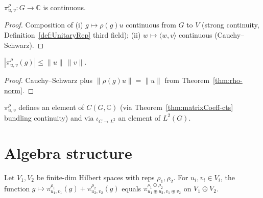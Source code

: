 \begin{theorem}
  \label{thm:matrixCoeff-cts}
  \leanok
  $\pi_{u,v}^\rho : G \to \mathbb C$ is continuous.
\end{theorem}

\begin{proof}
  Composition of (i) $g \mapsto \rho(g) u$ continuous from $G$ to $V$
  (strong continuity, Definition~\ref{def:UnitaryRep} third field);
  (ii) $w \mapsto \langle w, v\rangle$ continuous (Cauchy--Schwarz).
\end{proof}

\begin{theorem}
  \label{thm:matrixCoeff-bdd}
  \leanok
  $|\pi_{u,v}^\rho(g)| \leq \|u\|\,\|v\|$.
\end{theorem}

\begin{proof}
  Cauchy--Schwarz plus $\|\rho(g) u\| = \|u\|$ from Theorem~\ref{thm:rho-norm}.
\end{proof}

\begin{corollary}
  \label{cor:matrixCoeff-CG-L2}
  \leanok
  $\pi_{u,v}^\rho$ defines an element of $C(G, \mathbb C)$ (via
  Theorem~\ref{thm:matrixCoeff-cts} bundling continuity)
  and via $\iota_{C\to L^2}$ an element of $L^2(G)$.
\end{corollary}

\section{Algebra structure}

\begin{theorem}
  \label{thm:mc-sum}
  Let $V_1, V_2$ be finite-dim Hilbert spaces with reps $\rho_1, \rho_2$.
  For $u_i, v_i \in V_i$, the function
  $g \mapsto \pi_{u_1, v_1}^{\rho_1}(g) + \pi_{u_2, v_2}^{\rho_2}(g)$
  equals $\pi_{u_1 \oplus u_2, v_1 \oplus v_2}^{\rho_1 \oplus \rho_2}$
  on $V_1 \oplus V_2$.
\end{theorem}

